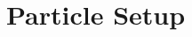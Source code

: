 \documentclass[nofootinbib,twocolumn,preprintnumbers]{revtex4-1}
\begin{document}
 
\section{Particle Setup}
\label{sec:nn}


\end{document}
